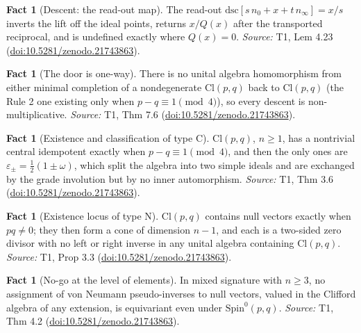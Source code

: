 \documentclass[11pt]{article}
\theoremstyle{definition}
\newtheorem{fact}[theorem]{Fact}
\theoremstyle{plain}
\providecommand{\Cl}{}\renewcommand{\Cl}{\mathrm{Cl}}
\providecommand{\Spin}{}\renewcommand{\Spin}{\mathrm{Spin}}
\providecommand{\dsc}{}\renewcommand{\dsc}{\mathrm{dsc}}
\providecommand{\nInf}{}\renewcommand{\nInf}{n_\infty}
\providecommand{\nO}{}\renewcommand{\nO}{n_0}
\begin{document}
\begin{fact}[Descent: the read-out map]\label{c:transport.descent-read-out-map}
The read-out $\dsc[s\,\nO + x + t\,\nInf] = x/s$ inverts the lift off the ideal points, returns $x/Q(x)$ after the transported reciprocal, and is undefined exactly where $Q(x) = 0$.
\emph{Source:} T1, Lem 4.23 (\href{https://doi.org/10.5281/zenodo.21743863}{doi:10.5281/zenodo.21743863}).
\end{fact}

\begin{fact}[The door is one-way]\label{c:transport.door-one-way}
There is no unital algebra homomorphism from either minimal completion of a nondegenerate $\Cl(p,q)$ back to $\Cl(p,q)$ (the Rule 2 one existing only when $p - q \equiv 1 \pmod 4$), so every descent is non-multiplicative.
\emph{Source:} T1, Thm 7.6 (\href{https://doi.org/10.5281/zenodo.21743863}{doi:10.5281/zenodo.21743863}).
\end{fact}

\begin{fact}[Existence and classification of type C]\label{c:transport.existence-classification-type-c}
$\Cl(p,q)$, $n \geq 1$, has a nontrivial central idempotent exactly when $p - q \equiv 1 \pmod 4$, and then the only ones are $\varepsilon_\pm = \tfrac12(1 \pm \omega)$, which split the algebra into two simple ideals and are exchanged by the grade involution but by no inner automorphism.
\emph{Source:} T1, Thm 3.6 (\href{https://doi.org/10.5281/zenodo.21743863}{doi:10.5281/zenodo.21743863}).
\end{fact}

\begin{fact}[Existence locus of type N]\label{c:transport.existence-locus-type-n}
$\Cl(p,q)$ contains null vectors exactly when $pq \neq 0$; they then form a cone of dimension $n - 1$, and each is a two-sided zero divisor with no left or right inverse in any unital algebra containing $\Cl(p,q)$.
\emph{Source:} T1, Prop 3.3 (\href{https://doi.org/10.5281/zenodo.21743863}{doi:10.5281/zenodo.21743863}).
\end{fact}

\begin{fact}[No-go at the level of elements]\label{c:transport.no-go-level-elements}
In mixed signature with $n \geq 3$, no assignment of von Neumann pseudo-inverses to null vectors, valued in the Clifford algebra of any extension, is equivariant even under $\Spin^0(p,q)$.
\emph{Source:} T1, Thm 4.2 (\href{https://doi.org/10.5281/zenodo.21743863}{doi:10.5281/zenodo.21743863}).
\end{fact}
\end{document}
